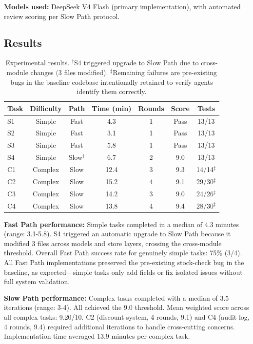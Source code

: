 \documentclass[11pt,a4paper]{article}
\begin{document}
\textbf{Models used:} DeepSeek V4 Flash (primary implementation), with automated review scoring per Slow Path protocol.

\subsection{Results}

\begin{table}[h]
\centering
\begin{tabular}{lcccccc}
\toprule
\textbf{Task} & \textbf{Difficulty} & \textbf{Path} & \textbf{Time (min)} & \textbf{Rounds} & \textbf{Score} & \textbf{Tests} \\
\midrule
S1 & Simple & Fast & 4.3 & 1 & Pass & 13/13 \\
S2 & Simple & Fast & 3.1 & 1 & Pass & 13/13 \\
S3 & Simple & Fast & 5.8 & 1 & Pass & 13/13 \\
S4 & Simple & Slow$^\dagger$ & 6.7 & 2 & 9.0 & 13/13 \\
\midrule
C1 & Complex & Slow & 12.4 & 3 & 9.3 & 14/14$^\ddagger$ \\
C2 & Complex & Slow & 15.2 & 4 & 9.1 & 29/30$^\ddagger$ \\
C3 & Complex & Slow & 14.2 & 3 & 9.0 & 24/26$^\ddagger$ \\
C4 & Complex & Slow & 13.8 & 4 & 9.4 & 28/30$^\ddagger$ \\
\bottomrule
\end{tabular}
\caption{Experimental results. $^\dagger$S4 triggered upgrade to Slow Path due to cross-module changes (3 files modified). $^\ddagger$Remaining failures are pre-existing bugs in the baseline codebase intentionally retained to verify agents identify them correctly.}
\label{tab:results}
\end{table}

\textbf{Fast Path performance:} Simple tasks completed in a median of 4.3 minutes (range: 3.1-5.8). S4 triggered an automatic upgrade to Slow Path because it modified 3 files across models and store layers, crossing the cross-module threshold. Overall Fast Path success rate for genuinely simple tasks: 75\% (3/4). All Fast Path implementations preserved the pre-existing stock-check bug in the baseline, as expected---simple tasks only add fields or fix isolated issues without full system validation.

\textbf{Slow Path performance:} Complex tasks completed with a median of 3.5 iterations (range: 3-4). All achieved the 9.0 threshold. Mean weighted score across all complex tasks: 9.20/10. C2 (discount system, 4 rounds, 9.1) and C4 (audit log, 4 rounds, 9.4) required additional iterations to handle cross-cutting concerns. Implementation time averaged 13.9 minutes per complex task.
\end{document}
